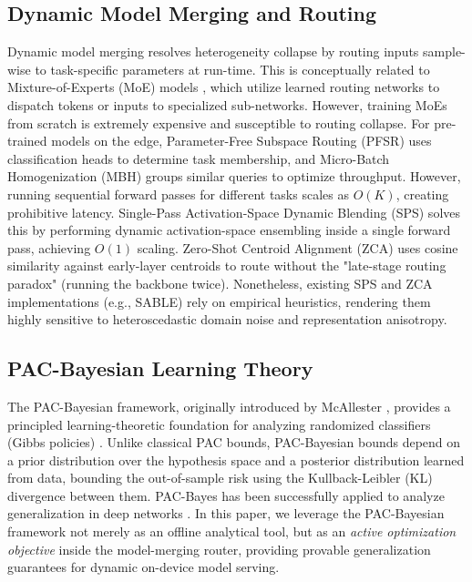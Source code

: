 \subsection{Dynamic Model Merging and Routing}
Dynamic model merging resolves heterogeneity collapse by routing inputs sample-wise to task-specific parameters at run-time. This is conceptually related to Mixture-of-Experts (MoE) models \cite{shazeer2017outrageously, fedus2022switch, riquelme2021scaling}, which utilize learned routing networks to dispatch tokens or inputs to specialized sub-networks. However, training MoEs from scratch is extremely expensive and susceptible to routing collapse. 
For pre-trained models on the edge, Parameter-Free Subspace Routing (PFSR) \cite{pfsr2025} uses classification heads to determine task membership, and Micro-Batch Homogenization (MBH) \cite{mbh2025} groups similar queries to optimize throughput. However, running sequential forward passes for different tasks scales as $O(K)$, creating prohibitive latency. 
Single-Pass Activation-Space Dynamic Blending (SPS) \cite{chatterjee2024robustness} solves this by performing dynamic activation-space ensembling inside a single forward pass, achieving $O(1)$ scaling. Zero-Shot Centroid Alignment (ZCA) uses cosine similarity against early-layer centroids to route without the "late-stage routing paradox" (running the backbone twice). Nonetheless, existing SPS and ZCA implementations (e.g., SABLE) rely on empirical heuristics, rendering them highly sensitive to heteroscedastic domain noise and representation anisotropy.

\subsection{PAC-Bayesian Learning Theory}
The PAC-Bayesian framework, originally introduced by McAllester \cite{mcallester1999pac, mcallester2003pac}, provides a principled learning-theoretic foundation for analyzing randomized classifiers (Gibbs policies) \cite{catoni2007pac}. Unlike classical PAC bounds, PAC-Bayesian bounds depend on a prior distribution over the hypothesis space and a posterior distribution learned from data, bounding the out-of-sample risk using the Kullback-Leibler (KL) divergence between them. PAC-Bayes has been successfully applied to analyze generalization in deep networks \cite{guedj2019primer, alquier2021user}. In this paper, we leverage the PAC-Bayesian framework not merely as an offline analytical tool, but as an \textit{active optimization objective} inside the model-merging router, providing provable generalization guarantees for dynamic on-device model serving.
